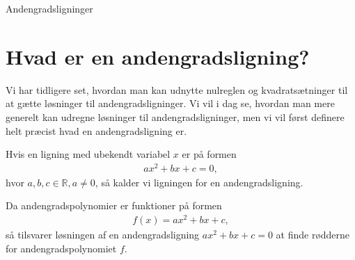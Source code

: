\documentclass[12pt]{article}
\begin{document}


\begin{center}
\Huge
Andengradsligninger
\end{center}

\section*{Hvad er en andengradsligning?}

Vi har tidligere set, hvordan man kan udnytte nulreglen og kvadratsætninger til at gætte løsninger til andengradsligninger. Vi vil i dag se, hvordan man mere generelt kan udregne løsninger til andengradsligninger, men vi vil først definere helt præcist hvad en andengradsligning er.
\begin{defn}[andengradsligning]
Hvis en ligning med ubekendt variabel $x$ er på formen 
\begin{align*}
ax^2+bx+c=0,
\end{align*}
hvor $a,b,c\in \mathbb{R}, a\neq 0$, så kalder vi ligningen for en andengradsligning. 
\end{defn}
Da andengradspolynomier er funktioner på formen 
\begin{align*}
f(x) = ax^2+bx+c, 
\end{align*}
så tilsvarer løsningen af en andengradsligning $ax^2+bx+c= 0$ at finde rødderne for andengradspolynomiet $f$.  
\end{document}
